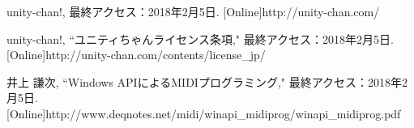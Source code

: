 \begin{thebibliography}{55}
unity-chan!, 最終アクセス：2018年2月5日.
 [Online]http://unity-chan.com/
 
unity-chan!, ``ユニティちゃんライセンス条項," 最終アクセス：2018年2月5日.
 [Online]http://unity-chan.com/contents/license\_jp/

井上 謙次, ``Windows APIによるMIDIプログラミング," 最終アクセス：2018年2月5日. 
 [Online]http://www.deqnotes.net/midi/winapi\_midiprog/winapi\_midiprog.pdf

\end{thebibliography}